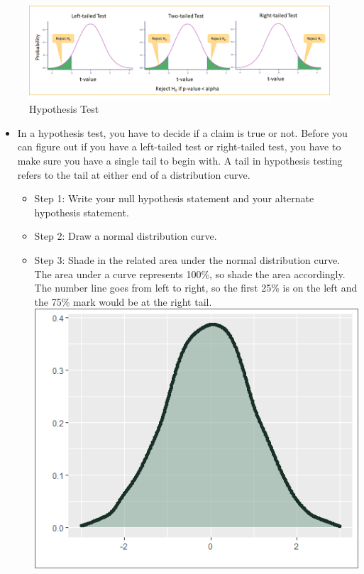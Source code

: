 \documentclass[
  letterpaper,
  DIV=11,
  numbers=noendperiod]{scrreprt}
\providecommand{\tightlist}{%
  \setlength{\itemsep}{0pt}\setlength{\parskip}{0pt}}\usepackage{longtable,booktabs,array}
\begin{document}
\begin{figure}[H]

{\centering \includegraphics{Pictures/Ch6/HypTest.png}

}

\caption{Hypothesis Test}

\end{figure}%

\begin{itemize}
\item
  In a hypothesis test, you have to decide if a claim is true or not.
  Before you can figure out if you have a left-tailed test or
  right-tailed test, you have to make sure you have a single tail to
  begin with. A tail in hypothesis testing refers to the tail at either
  end of a distribution curve.

  \begin{itemize}
  \tightlist
  \item
    Step 1: Write your null hypothesis statement and your alternate
    hypothesis statement.
  \item
    Step 2: Draw a normal distribution curve.
  \item
    Step 3: Shade in the related area under the normal distribution
    curve. The area under a curve represents 100\%, so shade the area
    accordingly. The number line goes from left to right, so the first
    25\% is on the left and the 75\% mark would be at the right tail.
    \includegraphics{Pictures/Ch6/Distribution.png}
  \end{itemize}
\end{itemize}
\end{document}
